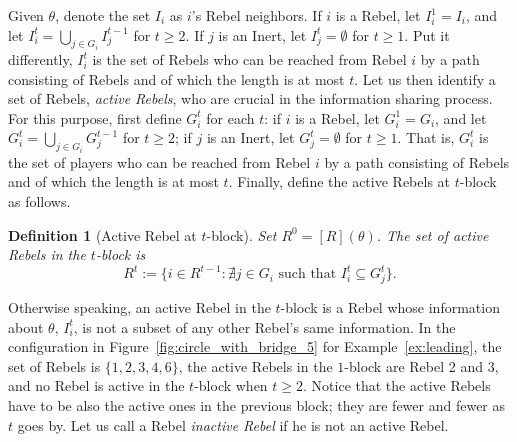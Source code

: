 \documentclass[12pt,letter]{article}
\newtheorem{definition}{Definition}[section]
\theoremstyle{definition}
\theoremstyle{definition}
\theoremstyle{remark}
\theoremstyle{claim}
\begin{document}
Given $\theta$, denote the set $I_i$ as $i$'s Rebel neighbors. If $i$ is a Rebel, let $I^1_i= I_i$, and let $I^t_i= \bigcup_{j\in G_i} I^{t-1}_j$ for $t\geq 2$. If $j$ is an Inert, let $I^t_j=\emptyset$ for $t\geq 1$. Put it differently, $I^t_i$ is the set of Rebels who can be reached from Rebel $i$ by a path consisting of Rebels and of which the length is at most $t$. Let us then identify a set of Rebels, \textit{active Rebels}, who are crucial in the information sharing process. For this purpose, first define $G^t_i$ for each $t$: if $i$ is a Rebel, let $G^1_i= G_i$, and let $G^t_i= \bigcup_{j\in G_i} G^{t-1}_j$ for $t\geq 2$; if $j$ is an Inert, let $G^t_j=\emptyset$ for $t\geq 1$. That is, $G^t_i$ is the set of players who can be reached from Rebel $i$ by a path consisting of Rebels and of which the length is at most $t$. Finally, define the active Rebels at $t$-block as follows.
\begin{definition}[Active Rebel at $t$-block]
Set $R^0=[R](\theta)$. The set of active Rebels in the $t$-block is 
\[\text{$R^t:= \{i\in R^{t-1}: \nexists j\in G_i \text{ such that }I^t_i\subseteq G^t_j\}$}.\]
\end{definition}
Otherwise speaking, an active Rebel in the $t$-block is a Rebel whose information about $\theta$, $I^t_i$, is not a subset of any other Rebel's same information. In the configuration in Figure~\ref{fig:circle_with_bridge_5} for Example~\ref{ex:leading}, the set of Rebels is $\{1,2,3,4,6\}$, the active Rebels in the $1$-block are Rebel 2 and 3, and no Rebel is active in the $t$-block when $t\geq 2$. %
Notice that the active Rebels have to be also the active ones in the previous block; they are fewer and fewer as $t$ goes by. Let us call a Rebel \textit{inactive Rebel} if he is not an active Rebel.

%
%    
%    
%    
%        
\end{document}
